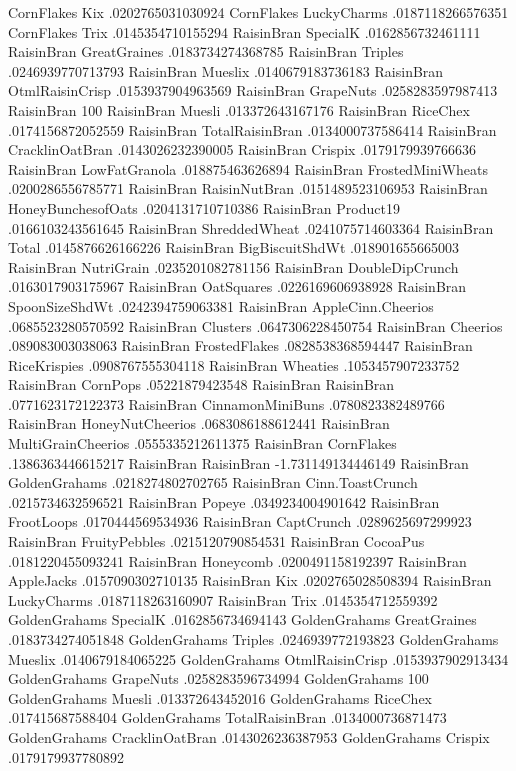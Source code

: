 CornFlakes	Kix	.0202765031030924
CornFlakes	LuckyCharms	.0187118266576351
CornFlakes	Trix	.0145354710155294
RaisinBran	SpecialK	.0162856732461111
RaisinBran	GreatGraines	.0183734274368785
RaisinBran	Triples	.0246939770713793
RaisinBran	Mueslix	.0140679183736183
RaisinBran	OtmlRaisinCrisp	.0153937904963569
RaisinBran	GrapeNuts	.0258283597987413
RaisinBran	100%
RaisinBran	Muesli	.013372643167176
RaisinBran	RiceChex	.0174156872052559
RaisinBran	TotalRaisinBran	.0134000737586414
RaisinBran	CracklinOatBran	.0143026232390005
RaisinBran	Crispix	.0179179939766636
RaisinBran	LowFatGranola	.018875463626894
RaisinBran	FrostedMiniWheats	.0200286556785771
RaisinBran	RaisinNutBran	.0151489523106953
RaisinBran	HoneyBunchesofOats	.0204131710710386
RaisinBran	Product19	.0166103243561645
RaisinBran	ShreddedWheat	.0241075714603364
RaisinBran	Total	.0145876626166226
RaisinBran	BigBiscuitShdWt	.018901655665003
RaisinBran	NutriGrain	.0235201082781156
RaisinBran	DoubleDipCrunch	.0163017903175967
RaisinBran	OatSquares	.0226169606938928
RaisinBran	SpoonSizeShdWt	.0242394759063381
RaisinBran	AppleCinn.Cheerios	.0685523280570592
RaisinBran	Clusters	.0647306228450754
RaisinBran	Cheerios	.089083003038063
RaisinBran	FrostedFlakes	.0828538368594447
RaisinBran	RiceKrispies	.0908767555304118
RaisinBran	Wheaties	.1053457907233752
RaisinBran	CornPops	.05221879423548
RaisinBran	RaisinBran	.0771623172122373
RaisinBran	CinnamonMiniBuns	.0780823382489766
RaisinBran	HoneyNutCheerios	.0683086188612441
RaisinBran	MultiGrainCheerios	.0555335212611375
RaisinBran	CornFlakes	.1386363446615217
RaisinBran	RaisinBran	-1.731149134446149
RaisinBran	GoldenGrahams	.0218274802702765
RaisinBran	Cinn.ToastCrunch	.0215734632596521
RaisinBran	Popeye	.0349234004901642
RaisinBran	FrootLoops	.0170444569534936
RaisinBran	CaptCrunch	.0289625697299923
RaisinBran	FruityPebbles	.0215120790854531
RaisinBran	CocoaPus	.0181220455093241
RaisinBran	Honeycomb	.0200491158192397
RaisinBran	AppleJacks	.0157090302710135
RaisinBran	Kix	.0202765028508394
RaisinBran	LuckyCharms	.0187118263160907
RaisinBran	Trix	.0145354712559392
GoldenGrahams	SpecialK	.0162856734694143
GoldenGrahams	GreatGraines	.0183734274051848
GoldenGrahams	Triples	.0246939772193823
GoldenGrahams	Mueslix	.0140679184065225
GoldenGrahams	OtmlRaisinCrisp	.0153937902913434
GoldenGrahams	GrapeNuts	.0258283596734994
GoldenGrahams	100%
GoldenGrahams	Muesli	.013372643452016
GoldenGrahams	RiceChex	.017415687588404
GoldenGrahams	TotalRaisinBran	.0134000736871473
GoldenGrahams	CracklinOatBran	.0143026236387953
GoldenGrahams	Crispix	.0179179937780892
